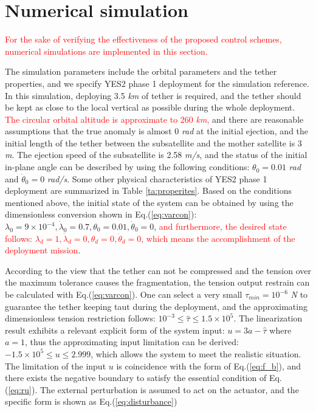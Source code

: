 \documentclass[3p]{elsarticle}
\theoremstyle{plain}
\begin{document}
\section{Numerical simulation}\label{sec:sm}
\textcolor{red}{For the sake of verifying the effectiveness of the proposed control schemes, numerical simulations are implemented in this section.}\par
The simulation parameters include the orbital parameters and the tether properties, and we specify YES2 phase 1 deployment for the simulation reference. In this simulation, deploying 3.5 \textit{km} of tether is required, and the tether should be kept as close to the local vertical as possible during the whole deployment. \textcolor{red}{The circular orbital altitude is approximate to 260 \textit{km},} and there are reasonable assumptions that the true anomaly is almost 0 \textit{rad} at the initial ejection, and the initial length of the tether between the subsatellite and the mother satellite is 3 \textit{m}. The ejection speed of the subsatellite is 2.58 \textit{m/s}, and the status of the initial in-plane angle can be described by using the following conditions: $\theta_0=0.01$ \textit{rad}  and $\dot\theta_0 = 0$ \textit{rad/s}. Some other physical characteristics of YES2 phase 1 deployment are summarized in Table \ref{ta:properites}. Based on the conditions mentioned above, the initial state of the system can be obtained by using the dimensionless conversion shown in Eq.(\ref{eq:varcon}): $\lambda_0 =9\times 10^{-4},\dot\lambda_0=0.7,\theta_0 = 0.01,\dot\theta_0=0$, \textcolor{red}{and furthermore, the desired state follows: $\lambda_d =1,\dot\lambda_d=0,\theta_d = 0,\dot\theta_d=0$, which means the accomplishment of the deployment mission}.\par
According to the view that the tether can not be compressed and the tension over the maximum tolerance causes the fragmentation, the tension output restrain can be calculated with Eq.(\ref{eq:varcon}). One can select a very small $\tau_{min} = 10^{-6}$ \textit{N} to guarantee the tether keeping taut during the deployment, and the approximating dimensionless tension restriction follows: $10^{-3}\le\hat{\tau}\le 1.5\times 10^5$. The linearization result exhibits a relevant explicit form of the system input: $u = 3a - \hat{\tau}$ where $a=1$, thus the approximating input limitation can be derived: $-1.5\times 10^5\le u\le2.999$, which allows the system to meet the realistic situation. The limitation of the input $u$ is coincidence with the form of Eq.(\ref{eq:f_b}), and there exists the negative boundary to satisfy the essential condition of Eq.(\ref{eq:ru}). The external perturbation is assumed to act on the actuator, and the specific form is shown as Eq.(\ref{eq:disturbance}) \par
\end{document}
